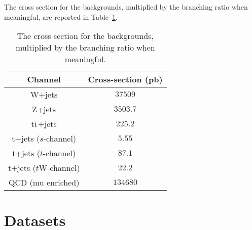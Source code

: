 The cross section for the backgrounds, multiplied by the branching ratio when meaningful, 
are reported in Table~\ref{tab:bkg_XS}. 
\begin{table}[htbp!]
  \begin{center}
  \begin{tabular}{c|c}
  \hline  \hline
  Channel & Cross-section (pb) \\
  \hline
  W+jets                        & $37509$ \\
  Z+jets                        & $3503.7$ \\
  t$\bar{\textnormal{t}}$+jets  & $225.2$ \\
  t+jets ($s$-channel)          & $5.55$ \\
  t+jets ($t$-channel)          & $87.1$\\
  t+jets ($t$W-channel)         & $22.2$ \\
  QCD (mu enriched)             & $134680$\\
  \hline  \hline
  \end{tabular}
  \end{center}
  \caption{The cross section for the backgrounds, multiplied by the branching ratio when meaningful.}
  \label{tab:bkg_XS}
\end{table}%
\section{Datasets}
\label{sec:technicalities}
